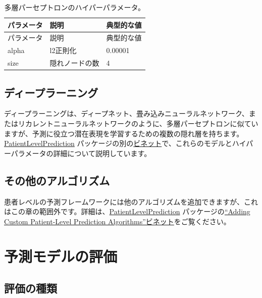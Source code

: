 \documentclass[
  11pt]{book}
\theoremstyle{definition}
\theoremstyle{definition}
\theoremstyle{definition}
\theoremstyle{definition}
\theoremstyle{remark}
\begin{document}
\begin{longtable}[]{@{}lll@{}}
\caption{\label{tab:mpParameters} 多層パーセプトロンのハイパーパラメータ。}\tabularnewline
\toprule\noalign{}
パラメータ & 説明 & 典型的な値 \\
\midrule\noalign{}
\endfirsthead
\toprule\noalign{}
パラメータ & 説明 & 典型的な値 \\
\midrule\noalign{}
\endhead
\bottomrule\noalign{}
\endlastfoot
alpha & l2正則化 & 0.00001 \\
size & 隠れノードの数 & 4 \\
\end{longtable}

\subsection{ディープラーニング}\label{ux30c7ux30a3ux30fcux30d7ux30e9ux30fcux30cbux30f3ux30b0}

ディープラーニングは、ディープネット、畳み込みニューラルネットワーク、またはリカレントニューラルネットワークのように、多層パーセプトロンに似ていますが、予測に役立つ潜在表現を学習するための複数の隠れ層を持ちます。\href{https://ohdsi.github.io/PatientLevelPrediction/}{PatientLevelPrediction} パッケージの別の\href{https://ohdsi.github.io/PatientLevelPrediction/articles/BuildingDeepLearningModels.html}{ビネット}で、これらのモデルとハイパーパラメータの詳細について説明しています。   

\subsection{その他のアルゴリズム}\label{ux305dux306eux4ed6ux306eux30a2ux30ebux30b4ux30eaux30baux30e0}

患者レベルの予測フレームワークには他のアルゴリズムを追加できますが、これはこの章の範囲外です。詳細は、\href{https://ohdsi.github.io/PatientLevelPrediction/}{PatientLevelPrediction} パッケージの\href{https://ohdsi.github.io/PatientLevelPrediction/articles/AddingCustomAlgorithms.html}{``Adding Custom Patient-Level Prediction Algorithms''ビネット}をご覧ください。

\section{予測モデルの評価}\label{ux4e88ux6e2cux30e2ux30c7ux30ebux306eux8a55ux4fa1}

\subsection{評価の種類}\label{ux8a55ux4fa1ux306eux7a2eux985e}
\end{document}
